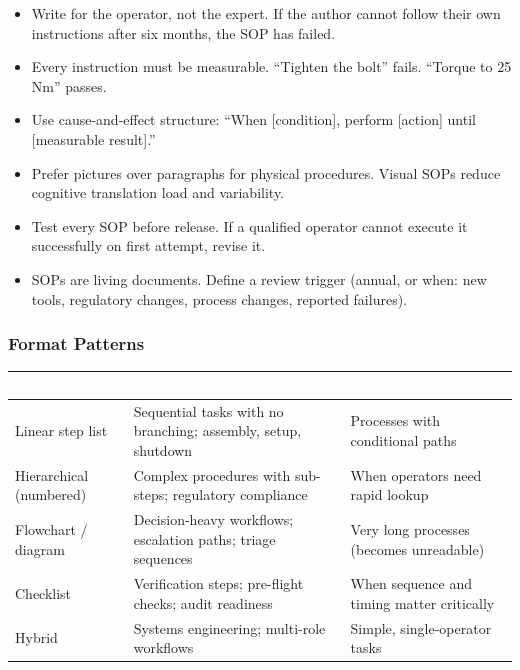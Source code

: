 \documentclass[11pt,letterpaper]{article}
\newcommand{\tableheader}[1]{\textbf{\sffamily\textcolor{white}{#1}}}
\begin{document}
\begin{itemize}[leftmargin=1.5em]
  \item Write for the operator, not the expert. If the author cannot follow their own instructions after six months, the SOP has failed.
  \item Every instruction must be measurable. ``Tighten the bolt'' fails. ``Torque to 25 Nm'' passes.
  \item Use cause-and-effect structure: ``When [condition], perform [action] until [measurable result].''
  \item Prefer pictures over paragraphs for physical procedures. Visual SOPs reduce cognitive translation load and variability.
  \item Test every SOP before release. If a qualified operator cannot execute it successfully on first attempt, revise it.
  \item SOPs are living documents. Define a review trigger (annual, or when: new tools, regulatory changes, process changes, reported failures).
\end{itemize}

\subsubsection{Format Patterns}

\begin{center}
\begin{tabularx}{\textwidth}{L{3cm}XL{3.5cm}}
\toprule
{}
\tableheader{Format} & \tableheader{Best Use} & \tableheader{When to Avoid} \\
\midrule
Linear step list & Sequential tasks with no branching; assembly, setup, shutdown & Processes with conditional paths \\
Hierarchical (numbered) & Complex procedures with sub-steps; regulatory compliance & When operators need rapid lookup \\
Flowchart / diagram & Decision-heavy workflows; escalation paths; triage sequences & Very long processes (becomes unreadable) \\
Checklist & Verification steps; pre-flight checks; audit readiness & When sequence and timing matter critically \\
Hybrid & Systems engineering; multi-role workflows & Simple, single-operator tasks \\
\bottomrule
\end{tabularx}
\end{center}
\end{document}
